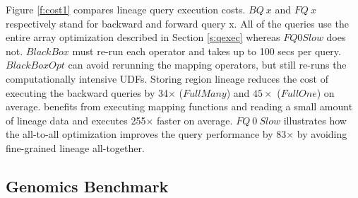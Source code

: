Figure \ref{f:cost1} compares lineage query execution costs. $BQ~x$ and $FQ~x$
respectively stand for backward and forward query x.  All of the queries use
the entire array optimization described in Section \ref{s:qexec} whereas $FQ 0
Slow$ does not.  $BlackBox$ must re-run each operator and takes up to 100 secs
per query.  $BlackBoxOpt$ can avoid rerunning the mapping operators, but still
re-runs the computationally intensive UDFs.  Storing region lineage reduces
the cost of executing the backward queries by 34$\times$ ($FullMany$) and
$45\times$ ($FullOne$) on average.  \sys{} benefits from executing mapping
functions and reading a small amount of lineage data and executes 255$\times$
faster on average.  $FQ\ 0\ Slow$ illustrates how the all-to-all optimization
improves the query performance by 83$\times$ by avoiding fine-grained lineage
all-together.
















\subsection{Genomics Benchmark}




